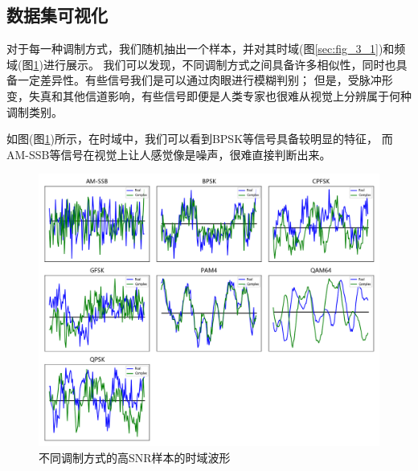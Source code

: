 \subsection{数据集可视化}

对于每一种调制方式，我们随机抽出一个样本，并对其时域(图\ref{sec:fig_3_1})和频域(图\ref{sec:fig_3_2})进行展示。
我们可以发现，不同调制方式之间具备许多相似性，同时也具备一定差异性。有些信号我们是可以通过肉眼进行模糊判别；
但是，受脉冲形变，失真和其他信道影响，有些信号即便是人类专家也很难从视觉上分辨属于何种调制类别。\par

如图(图\ref{sec:fig_3_2})所示，在时域中，我们可以看到BPSK等信号具备较明显的特征，
而AM-SSB等信号在视觉上让人感觉像是噪声，很难直接判断出来。\par

\begin{figure}[!h]
	\centering
	\includegraphics[scale=0.45]{figures/chapter_3/fig_3_2}
	\caption{不同调制方式的高SNR样本的时域波形}\label{sec:fig_3_2}
\end{figure}

